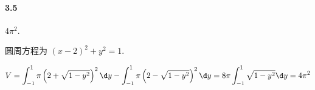 \paragraph*{3.5} $4\pi^2$.

圆周方程为 $(x - 2)^2 + y^2 = 1$.

\[
	V = \int_{-1}^{1}\pi\left(2 + \sqrt{1 - y^2}\right)^2 \d y - \int_{-1}^{1} \pi \left(2 - \sqrt{1 - y^2}\right)^2 \d y = 8\pi \int_{-1}^{1} \sqrt{1 - y^2}\d y
	= 4\pi^2
\]